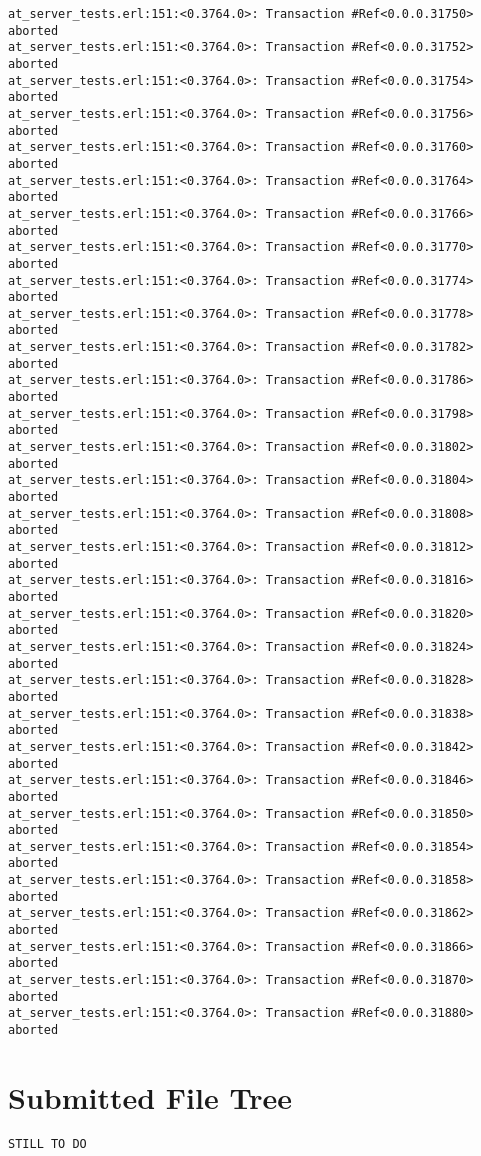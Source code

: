 \documentclass[
paper=a4,
oneside,
fontsize=11pt,
numbers=noenddot,
headinclude=false, %
footinclude=false, %
fleqn,             %
DIV=8
]{scrartcl}
\begin{document}
\begin{lstlisting}[caption=Session output: {\tt
    commit\_t\_competing\_test()} (debug enabled),
  label=lst:testoutextapi, basicstyle=\ttfamily\scriptsize]
at_server_tests.erl:151:<0.3764.0>: Transaction #Ref<0.0.0.31750> aborted
at_server_tests.erl:151:<0.3764.0>: Transaction #Ref<0.0.0.31752> aborted
at_server_tests.erl:151:<0.3764.0>: Transaction #Ref<0.0.0.31754> aborted
at_server_tests.erl:151:<0.3764.0>: Transaction #Ref<0.0.0.31756> aborted
at_server_tests.erl:151:<0.3764.0>: Transaction #Ref<0.0.0.31760> aborted
at_server_tests.erl:151:<0.3764.0>: Transaction #Ref<0.0.0.31764> aborted
at_server_tests.erl:151:<0.3764.0>: Transaction #Ref<0.0.0.31766> aborted
at_server_tests.erl:151:<0.3764.0>: Transaction #Ref<0.0.0.31770> aborted
at_server_tests.erl:151:<0.3764.0>: Transaction #Ref<0.0.0.31774> aborted
at_server_tests.erl:151:<0.3764.0>: Transaction #Ref<0.0.0.31778> aborted
at_server_tests.erl:151:<0.3764.0>: Transaction #Ref<0.0.0.31782> aborted
at_server_tests.erl:151:<0.3764.0>: Transaction #Ref<0.0.0.31786> aborted
at_server_tests.erl:151:<0.3764.0>: Transaction #Ref<0.0.0.31798> aborted
at_server_tests.erl:151:<0.3764.0>: Transaction #Ref<0.0.0.31802> aborted
at_server_tests.erl:151:<0.3764.0>: Transaction #Ref<0.0.0.31804> aborted
at_server_tests.erl:151:<0.3764.0>: Transaction #Ref<0.0.0.31808> aborted
at_server_tests.erl:151:<0.3764.0>: Transaction #Ref<0.0.0.31812> aborted
at_server_tests.erl:151:<0.3764.0>: Transaction #Ref<0.0.0.31816> aborted
at_server_tests.erl:151:<0.3764.0>: Transaction #Ref<0.0.0.31820> aborted
at_server_tests.erl:151:<0.3764.0>: Transaction #Ref<0.0.0.31824> aborted
at_server_tests.erl:151:<0.3764.0>: Transaction #Ref<0.0.0.31828> aborted
at_server_tests.erl:151:<0.3764.0>: Transaction #Ref<0.0.0.31838> aborted
at_server_tests.erl:151:<0.3764.0>: Transaction #Ref<0.0.0.31842> aborted
at_server_tests.erl:151:<0.3764.0>: Transaction #Ref<0.0.0.31846> aborted
at_server_tests.erl:151:<0.3764.0>: Transaction #Ref<0.0.0.31850> aborted
at_server_tests.erl:151:<0.3764.0>: Transaction #Ref<0.0.0.31854> aborted
at_server_tests.erl:151:<0.3764.0>: Transaction #Ref<0.0.0.31858> aborted
at_server_tests.erl:151:<0.3764.0>: Transaction #Ref<0.0.0.31862> aborted
at_server_tests.erl:151:<0.3764.0>: Transaction #Ref<0.0.0.31866> aborted
at_server_tests.erl:151:<0.3764.0>: Transaction #Ref<0.0.0.31870> aborted
at_server_tests.erl:151:<0.3764.0>: Transaction #Ref<0.0.0.31880> aborted
\end{lstlisting}

\section{Submitted File Tree}
\label{sec:submitted-files}

\begin{lstlisting}[caption=File tree under {\tt src/}, label=lst:filetree]
STILL TO DO
\end{lstlisting}
\end{document}
